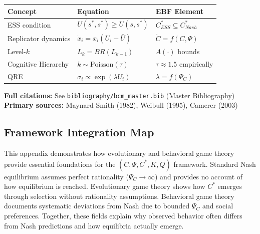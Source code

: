 \begin{tcolorbox}[colback=yellow!5!white, colframe=yellow!75!black,
    title=\textbf{Quick Reference: Key Equations}]

\renewcommand{\arraystretch}{1.3}
\begin{tabular}{@{}p{4cm}p{5cm}p{4cm}@{}}
\toprule
\textbf{Concept} & \textbf{Equation} & \textbf{EBF Element} \\
\midrule
ESS condition & $U(s^*, s^*) \geq U(s, s^*)$ & $C^*_{ESS} \subseteq C^*_{Nash}$ \\
Replicator dynamics & $\dot{x}_i = x_i(U_i - \bar{U})$ & $\dot{C} = f(C, \Psi)$ \\
Level-$k$ & $L_k = BR(L_{k-1})$ & $A(\cdot)$ bounds \\
Cognitive Hierarchy & $k \sim \text{Poisson}(\tau)$ & $\tau \approx 1.5$ empirically \\
QRE & $\sigma_i \propto \exp(\lambda U_i)$ & $\lambda = f(\Psi_C)$ \\
\bottomrule
\end{tabular}

\end{tcolorbox}

\noindent\textbf{Full citations:} See \texttt{bibliography/bcm\_master.bib} (Master Bibliography) \\
\textbf{Primary sources:} Maynard Smith (1982), Weibull (1995), Camerer (2003)

\vspace{1em}

\subsection{Framework Integration Map}

This appendix demonstrates how evolutionary and behavioral game theory provide 
essential foundations for the $(C, \Psi, C^*, K, Q)$ framework. Standard Nash 
equilibrium assumes perfect rationality ($\Psi_C \to \infty$) and provides no 
account of how equilibrium is reached. Evolutionary game theory shows how 
$C^*$ emerges through selection without rationality assumptions. Behavioral 
game theory documents systematic deviations from Nash due to bounded $\Psi_C$ 
and social preferences. Together, these fields explain why observed behavior 
often differs from Nash predictions and how equilibria actually emerge.

